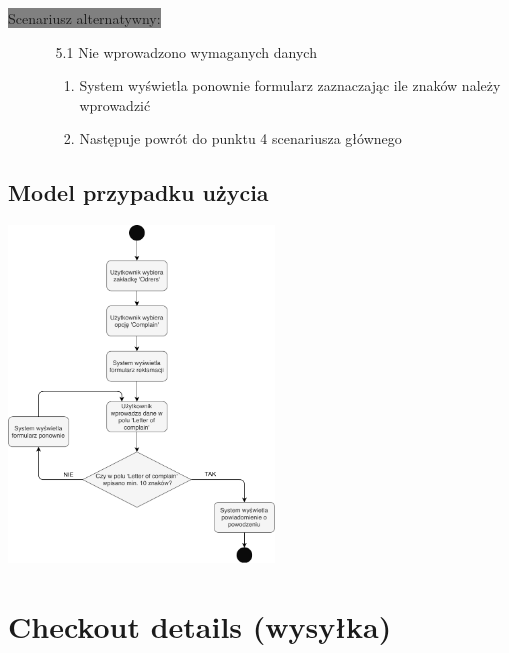 \documentclass[10pt]{report}
\begin{document}
			\colorbox{grey}{Scenariusz alternatywny:}
			\begin{enumerate}\addtocounter{enumi}{2}
				\item[]
				\begin{enumerate}
					\item[5.1] Nie wprowadzono wymaganych danych
					\begin{enumerate}
						\item System wyświetla ponownie formularz zaznaczając ile znaków należy wprowadzić
						\item Następuje powrót do punktu 4 scenariusza głównego
					\end{enumerate}
				\end{enumerate}
			\end{enumerate}
			 
			
		\subsection{Model przypadku użycia}
			\begin{center}
				\includegraphics[width=200pt]{reklamacja.pdf}
			\end{center}
			 
			 \newpage
			
	\section{Checkout details (wysyłka)}
		
\end{document}
